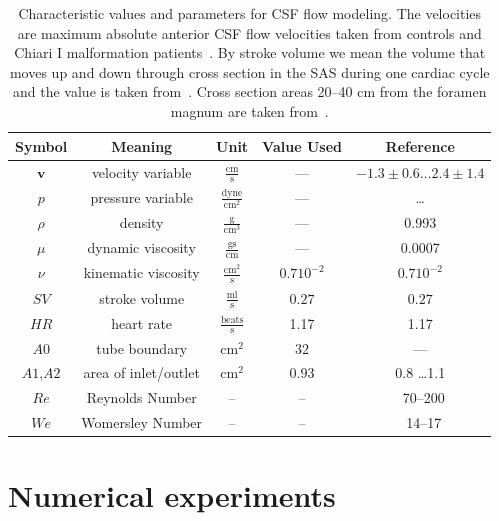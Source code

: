 \begin{table}
\begin{center}
    \begin{tabular}{ | c | c | c | c | c | }
    \hline
    Symbol & Meaning & Unit & Value Used & Reference \\ \hline\hline
	$\mathbf{v}$	& velocity variable & $\mathrm{ \frac{cm}{s}}$ & --- & $-1.3\pm 0.6 \ldots 2.4 \pm 1.4$  \\
	$p$		& pressure	variable & $\mathrm{\frac{dyne}{cm^2}}$ & --- & \ldots\\
	$\rho$	& density & $\mathrm{\frac{g}{cm^3}}$ & --- &0.993 \\ %
	$\mu$	& dynamic viscosity	&  $\mathrm{\frac{g s}{cm}}$ & --- & 0.0007\\
	$\nu$	& kinematic viscosity & $\mathrm{ \frac{cm^2}{s}}$ & $0.7 10^{-2}$ & $0.7 10^{-2}$ \\ 	\hline %
	$SV$	& stroke volume 	& $\mathrm{ \frac{ml}{s}}$& $0.27$  & $0.27$ \\
	$HR$	& heart rate & $\mathrm{\frac{beats}{s}}$	& 1.17 & 1.17\\
	$A0$	& tube boundary	& $\mathrm{ cm^2}$ & $32$  & ---\\
	$A1$,$A2$	& area of inlet/outlet & $\mathrm{ cm^2}$ &$0.93$ & 0.8 \ldots 1.1   \\
    \hline
    $Re$    & Reynolds Number & -- & -- & ~70--200 \\
    $We$    & Womersley Number & -- & -- & ~14--17 \\
    \hline
    \end{tabular}
	\label{tab:entities}
\vspace{1cm}
\caption{
Characteristic values and parameters for CSF flow modeling.  The
velocities are maximum absolute anterior CSF flow velocities taken
from controls and Chiari I malformation
patients~\citep{HofmannWarmuth-MetzBendszusEtAl2000}.  By stroke
volume we mean the volume that moves up and down through cross section
in the SAS during one cardiac cycle and the value is taken
from~\citep{GuptaSoellingerBoesigerEtAl2009}.  Cross section areas
20--40 cm from the foramen magnum are taken
from~\citep{LothYardimciAlperin2001}.  }
\end{center}
\end{table}


\section{Numerical experiments}

